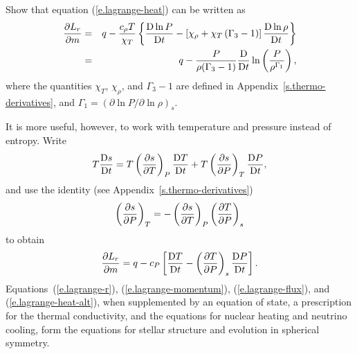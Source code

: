 \begin{exercisebox}
 \label{p.lagrange-heat} Show that equation (\ref{e.lagrange-heat}) can be written as
\begin{eqnarray}
\frac{\partial L_{r}}{\partial m} &=& q - \frac{c_{\rho} T}{\chi_{T}}\left\{\frac{\mathrm{D}\ln P}{\mathrm{D} t} - \left[\chi_{\rho} + \chi_{T}\left(\Gamma_{3} - 1\right)\right]\frac{\mathrm{D}\ln \rho}{\mathrm{D} t}\right\}\\
 &=& q - \frac{P}{\rho(\Gamma_{3}-1)}\frac{\mathrm{D} }{\mathrm{D} t}\ln\left(\frac{P}{\rho^{\Gamma_{1}}}\right),
\label{e.lagrange-heat-alt2}
\end{eqnarray}
where the quantities $\chi_{T}$, $\chi_{\rho}$, and $\Gamma_{3}-1$ are defined in Appendix~\ref{s.thermo-derivatives}, and $\Gamma_{1} = (\partial \ln P/\partial\ln \rho)_{s}$. 
\end{exercisebox}


It is more useful, however, to work with temperature and pressure instead of entropy.  Write
\[
	T\frac{\mathrm{D} s}{\mathrm{D} t} = T\left(\frac{\partial s}{\partial T}\right)_{P}\frac{\mathrm{D} T}{\mathrm{D} t} + T\left(\frac{\partial s}{\partial P}\right)_{T}\frac{\mathrm{D} P}{\mathrm{D} t},
\]
and use the identity (see Appendix~\ref{s.thermo-derivatives})
\[
	\left(\frac{\partial s}{\partial P}\right)_{T} = -\left(\frac{\partial s}{\partial T}\right)_{P}\left(\frac{\partial T}{\partial P}\right)_{s}
\]
to obtain
\begin{equation}\label{e.lagrange-heat-alt}
	\frac{\partial L_{r}}{\partial m} 
	= q - c_{P}\left[ \frac{\mathrm{D} T}{\mathrm{D} t} - \left(\frac{\partial T}{\partial P}\right)_{s} \frac{\mathrm{D} P}{\mathrm{D} t}\right].
\end{equation}
Equations~(\ref{e.lagrange-r}), (\ref{e.lagrange-momentum}), (\ref{e.lagrange-flux}), and (\ref{e.lagrange-heat-alt}), when supplemented by an equation of state, a prescription for the thermal conductivity, and the equations for nuclear heating and neutrino cooling, form the equations for stellar structure and evolution in spherical symmetry. 

